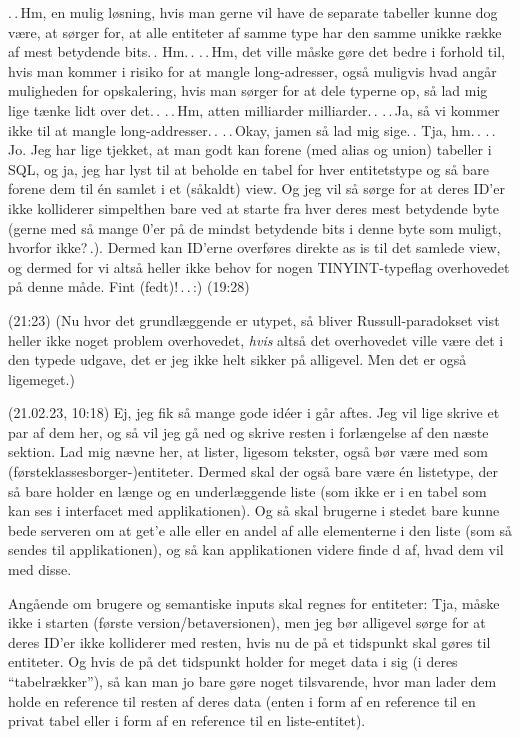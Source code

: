 \documentclass{report}
\begin{document}
.\,.\,Hm, en mulig løsning, hvis man gerne vil have de separate tabeller kunne dog være, at sørger for, at alle entiteter af samme type har den samme unikke række af mest betydende bits.\,. Hm.\,. .\,.\,Hm, det ville måske gøre det bedre i forhold til, hvis man kommer i risiko for at mangle long-adresser, også muligvis hvad angår muligheden for opskalering, hvis man sørger for at dele typerne op, så lad mig lige tænke lidt over det.\,. .\,.\,Hm, atten milliarder milliarder.\,. .\,.\,Ja, så vi kommer ikke til at mangle long-addresser.\,. .\,.\,Okay, jamen så lad mig sige.\,. Tja, hm.\,. .\,.\,Jo. Jeg har lige tjekket, at man godt kan forene (med alias og union) tabeller i SQL, og ja, jeg har lyst til at beholde en tabel for hver entitetstype og så bare forene dem til én samlet i et (såkaldt) view. Og jeg vil så sørge for at deres ID'er ikke kolliderer simpelthen bare ved at starte fra hver deres mest betydende byte (gerne med så mange 0'er på de mindst betydende bits i denne byte som muligt, hvorfor ikke?\,.). Dermed kan ID'erne overføres direkte as is til det samlede view, og dermed for vi altså heller ikke behov for nogen TINYINT-typeflag overhovedet på denne måde. Fint (fedt)!\,.\,.\,:) (19:28)

(21:23) (Nu hvor det grundlæggende er utypet, så bliver Russull-paradokset vist heller ikke noget problem overhovedet, \emph{hvis} altså det overhovedet ville være det i den typede udgave, det er jeg ikke helt sikker på alligevel. Men det er også ligemeget.)

(21.02.23, 10:18) Ej, jeg fik så mange gode idéer i går aftes. Jeg vil lige skrive et par af dem her, og så vil jeg gå ned og skrive resten i forlængelse af den næste sektion. Lad mig nævne her, at lister, ligesom tekster, også bør være med som (førsteklassesborger-)entiteter. Dermed skal der også bare være én listetype, der så bare holder en længe og en underlæggende liste (som ikke er i en tabel som kan ses i interfacet med applikationen). Og så skal brugerne i stedet bare kunne bede serveren om at get'e alle eller en andel af alle elementerne i den liste (som så sendes til applikationen), og så kan applikationen videre finde d af, hvad dem vil med disse. 

Angående om brugere og semantiske inputs skal regnes for entiteter: Tja, måske ikke i starten (første version/betaversionen), men jeg bør alligevel sørge for at deres ID'er ikke kolliderer med resten, hvis nu de på et tidspunkt skal gøres til entiteter. Og hvis de på det tidspunkt holder for meget data i sig (i deres ``tabelrækker''), så kan man jo bare gøre noget tilsvarende, hvor man lader dem holde en reference til resten af deres data (enten i form af en reference til en privat tabel eller i form af en reference til en liste-entitet). 
\end{document}
